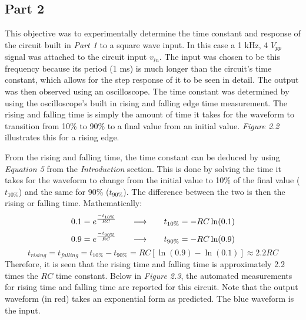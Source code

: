 \documentclass[12pt]{article}
\begin{document}
\subsection*{Part 2}
This objective was to experimentally determine the time constant and response of the circuit built in \textit{Part 1} to a square wave input. In this case a 1 kHz, 4 $V_{pp}$ signal was attached to the circuit input $v_{in}$. The input was chosen to be this frequency because its period (1 ms) is much longer than the circuit's time constant, which allows for the step response of it to be seen in detail. The output was then observed using an oscilloscope. The time constant was determined by using the oscilloscope's built in rising and falling edge time measurement. The rising and falling time is simply the amount of time it takes for the waveform to transition from 10\% to 90\% to a final value from an initial value. \textit{Figure 2.2} illustrates this for a rising edge.\par\vspace{-12pt}
\begin{center}
    	\resizebox{0.6\textwidth}{!}{}
\end{center}
From the rising and falling time, the time constant can be deduced by using \textit{Equation 5} from the \textit{Introduction} section. This is done by solving the time it takes for the waveform to change from the initial value to 10\% of the final value ($t_{10\%}$) and the same for 90\% ($t_{90\%}$). The difference between the two is then the rising or falling time. Mathematically:
\begin{equation}
0.1 = e^{\frac{-t_{10\%}}{RC}}\hspace{0.25in}\longrightarrow\hspace{0.25in} t_{10\%} = -RC\ln(0.1)
\end{equation}
\begin{equation}
0.9 = e^{\frac{-t_{90\%}}{RC}}\hspace{0.25in}\longrightarrow\hspace{0.25in} t_{90\%} = -RC\ln(0.9)
\end{equation}
\begin{equation}
t_{rising}=t_{falling}= t_{10\%}-t_{90\%} = RC[\ln(0.9)-\ln(0.1)] \approx 2.2RC
\end{equation}
Therefore, it is seen that the rising time and falling time is approximately 2.2 times the $RC$ time constant. Below in \textit{Figure 2.3}, the automated measurements for rising time and falling time are reported for this circuit. Note that the output waveform (in red) takes an exponential form as predicted. The blue waveform is the input.\par\vspace{6pt}
\end{document}
